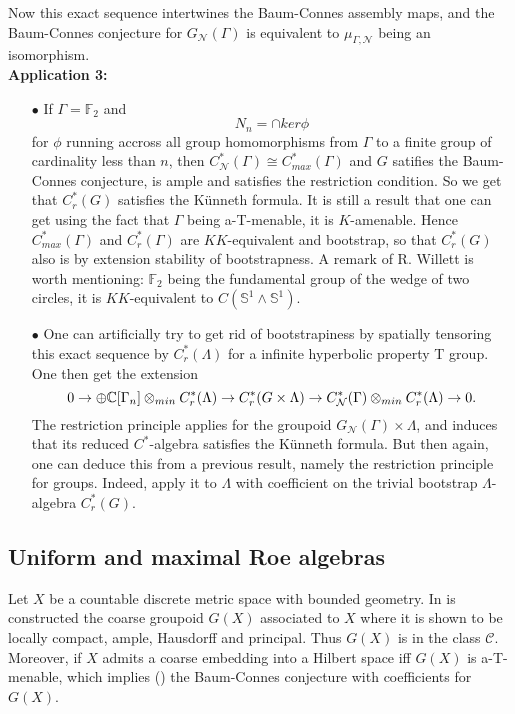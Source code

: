 Now this exact sequence intertwines the Baum-Connes assembly maps, and the Baum-Connes conjecture for $G_{\mathcal N}(\Gamma)$ is equivalent to $\mu_{\Gamma,\mathcal N}$ being an isomorphism. \\

\textbf{Application 3:} 
\begin{itemize}
\item[$\bullet$] If $\Gamma= \mathbb F_2$ and 
\[N_n = \cap ker \phi \]
for $\phi$ running accross all group homomorphisms from $\Gamma$ to a finite group of cardinality less than $n$, then $C_{\mathcal N}^*(\Gamma) \cong C_{max}^*(\Gamma)$ and $G$ satifies the Baum-Connes conjecture, is ample and satisfies the restriction condition. So we get that $C_r^*(G)$ satisfies the Künneth formula. It is still a result that one can get using the fact that $\Gamma$ being a-T-menable, it is $K$-amenable. Hence $C^*_{max}(\Gamma)$ and $C_r^*(\Gamma)$ are $KK$-equivalent and bootstrap, so that $C_r^*(G)$ also is by extension stability of bootstrapness. A remark of R. Willett is worth mentioning: $\mathbb F_2$ being the fundamental group of the wedge of two circles, it is $KK$-equivalent to $C(\mathbb S^1 \wedge \mathbb S^1)$.\\
\item[$\bullet$] One can artificially try to get rid of bootstrapiness by spatially tensoring this exact sequence by $C_r^*(\Lambda)$ for a infinite hyperbolic property T group. One then get the extension
\[ 0 \rightarrow \oplus \mathbb C[\Gamma_n] \otimes_{min} C_r^*(\Lambda) \rightarrow C_r^*(G\times \Lambda) \rightarrow C^*_{\mathcal N} (\Gamma)\otimes_{min} C_r^*(\Lambda)   \rightarrow 0.\]
The restriction principle applies for the groupoid $G_{\mathcal N}(\Gamma)\times\Lambda$, and induces that its reduced $C^*$-algebra satisfies the Künneth formula. But then again, one can deduce this from a previous result, namely the restriction principle for groups. Indeed, apply it to $\Lambda$ with coefficient on the trivial bootstrap $\Lambda$-algebra $C_r^*(G)$.	\\ 
\end{itemize} 


\subsection{Uniform and maximal Roe algebras}

Let $X$ be a countable discrete metric space with bounded geometry. In \cite{SkTuYu} is constructed the coarse groupoid $G(X)$ associated to $X$ where it is shown to be locally compact, ample, Hausdorff and principal. Thus $G(X)$ is in the class $\mathcal C$. Moreover, if $X$ admits a coarse embedding into a Hilbert space iff $G(X)$ is a-T-menable, which implies (\cite{TuThese}) the Baum-Connes conjecture with coefficients for $G(X)$.\\

